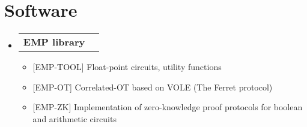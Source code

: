 \documentclass[letterpaper,11pt]{article}
\makeatletter
\newcommand{\resumeItem}[1]{
  \item\small{
    {#1 \vspace{-2pt}}
  }
}
\newcommand{\resumeProjectHeading}[2]{
    \item
    \begin{tabular*}{0.97\textwidth}{l@{\extracolsep{\fill}}r}
      \small#1 & #2 \\
    \end{tabular*}\vspace{-7pt}
}
\newcommand{\resumeDevHeading}[1]{
    \item
    \begin{tabular*}{0.97\textwidth}{l@{\extracolsep{\fill}}r}
        \textbf{#1} \\
    \end{tabular*}\vspace{-7pt}
}
\newcommand{\resumeSubHeadingListEnd}{\end{itemize}}
\newcommand{\resumeItemListStart}{\begin{itemize}}
\newcommand{\resumeItemListEnd}{\end{itemize}\vspace{-5pt}}
\makeatother
\begin{document}



%
\section{Software}
 \begin{itemize}[leftmargin=0.15in, label={}]
    \resumeDevHeading
      {\small EMP library}
      \resumeItemListStart
		 \resumeItem{[EMP-TOOL] Float-point circuits, utility functions}
		 \resumeItem{[EMP-OT] Correlated-OT based on VOLE (The Ferret protocol)}
		 \resumeItem{[EMP-ZK] Implementation of zero-knowledge proof protocols for boolean and arithmetic circuits}
      \resumeItemListEnd
 \end{itemize}


\end{document}
